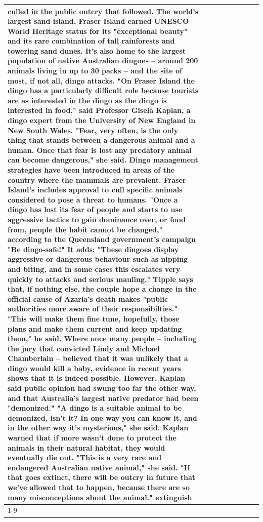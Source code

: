\begin{table}[H]
\begin{tabular}{lllrlllll}
culled in the public outcry that followed. The world's largest sand island, Fraser Island earned UNESCO World Heritage status for its "exceptional beauty" and its rare combination of tall rainforests and towering sand dunes. It's also home to the largest population of native Australian dingoes -- around 200 animals living in up to 30 packs -- and the site of most, if not all, dingo attacks. "On Fraser Island the dingo has a particularly difficult role because tourists are as interested in the dingo as the dingo is interested in food," said Professor Gisela Kaplan, a dingo expert from the University of New England in New South Wales. "Fear, very often, is the only thing that stands between a dangerous animal and a human. Once that fear is lost any predatory animal can become dangerous," she said. Dingo management strategies have been introduced in areas of the country where the mammals are prevalent. Fraser Island's includes approval to cull specific animals considered to pose a threat to humans. "Once a dingo has lost its fear of people and starts to use aggressive tactics to gain dominance over, or food from, people the habit cannot be changed," according to the Queensland government's campaign "Be dingo-safe!" It adds: "These dingoes display aggressive or dangerous behaviour such as nipping and biting, and in some cases this escalates very quickly to attacks and serious mauling." Tipple says that, if nothing else, the couple hope a change in the official cause of Azaria's death makes "public authorities more aware of their responsibilties." "This will make them fine tune, hopefully, those plans and make them current and keep updating them," he said. Where once many people -- including the jury that convicted Lindy and Michael Chamberlain -- believed that it was unlikely that a dingo would kill a baby, evidence in recent years shows that it is indeed possible. However, Kaplan said public opinion had swung too far the other way, and that Australia's largest native predator had been "demonized." "A dingo is a suitable animal to be demonized, isn't it? In one way you can know it, and in the other way it's mysterious," she said. Kaplan warned that if more wasn't done to protect the animals in their natural habitat, they would eventually die out. "This is a very rare and endangered Australian native animal," she said. "If that goes extinct, there will be outcry in future that we've allowed that to happen, because there are so many misconceptions about the animal." extinguish \\
\cline{1-9}

\end{tabular}
\end{table}
